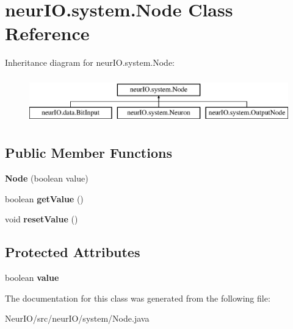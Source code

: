 \hypertarget{classneur_i_o_1_1system_1_1_node}{}\section{neur\+I\+O.\+system.\+Node Class Reference}
\label{classneur_i_o_1_1system_1_1_node}
Inheritance diagram for neur\+I\+O.\+system.\+Node\+:\begin{figure}[H]
\begin{center}
\leavevmode
\includegraphics[height=2.000000cm]{classneur_i_o_1_1system_1_1_node}
\end{center}
\end{figure}
\subsection*{Public Member Functions}
\begin{DoxyCompactItemize}
\item 
\mbox{\label{classneur_i_o_1_1system_1_1_node_a82de053582ee57d0ed239293a5b260ba}} 
{\bfseries Node} (boolean value)
\item 
\mbox{\label{classneur_i_o_1_1system_1_1_node_abcfb650e20f0e7b94dcdbcee0a92852c}} 
boolean {\bfseries get\+Value} ()
\item 
\mbox{\label{classneur_i_o_1_1system_1_1_node_afd4bea06756a10a4dc05dc06afdcd459}} 
void {\bfseries reset\+Value} ()
\end{DoxyCompactItemize}
\subsection*{Protected Attributes}
\begin{DoxyCompactItemize}
\item 
\mbox{\label{classneur_i_o_1_1system_1_1_node_a2c6a229d3d2cbf1b313d8797b70e487a}} 
boolean {\bfseries value}
\end{DoxyCompactItemize}


The documentation for this class was generated from the following file\+:\begin{DoxyCompactItemize}
\item 
Neur\+I\+O/src/neur\+I\+O/system/Node.\+java\end{DoxyCompactItemize}
